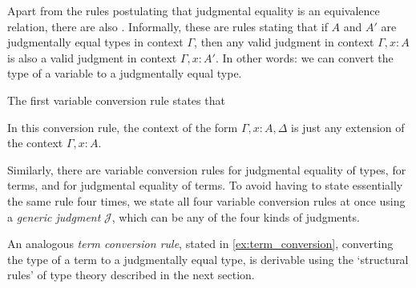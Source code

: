 \bigskip
Apart from the rules postulating that judgmental equality is an equivalence relation, there are also .
Informally, these are rules stating that if $A$ and $A'$ are judgmentally equal types in context $\Gamma$, then any valid judgment in context $\Gamma,x:A$ is also a valid judgment in context $\Gamma,x:A'$. In other words: we can convert the type of a variable to a judgmentally equal type.

The first variable conversion rule states that
\begin{prooftree}
\end{prooftree}
In this conversion rule, the context of the form $\Gamma,x:A,\Delta$ is just any extension of the context $\Gamma,x:A$.

Similarly, there are variable conversion rules for judgmental equality of types, for terms, and for judgmental equality of terms. To avoid having to state essentially the same rule four times, we state all four variable conversion rules at once using a \emph{generic judgment} $\mathcal{J}$, which can be any of the four kinds of judgments.
\begin{prooftree}
\end{prooftree}
An analogous \emph{term conversion rule}, stated in \cref{ex:term_conversion}, converting the type of a term to a judgmentally equal type, is derivable using the `structural rules' of type theory described in the next section.

